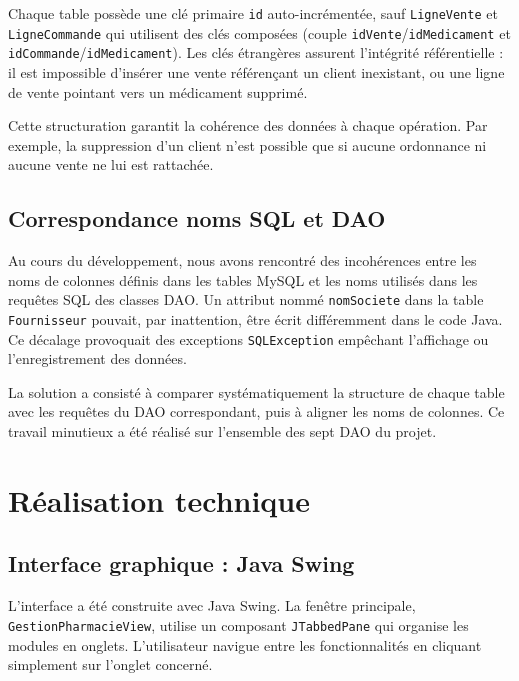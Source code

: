 \documentclass[12pt,a4paper]{report}
\begin{document}
Chaque table possède une clé primaire \texttt{id} auto-incrémentée, sauf \texttt{LigneVente} et \texttt{LigneCommande} qui utilisent des clés composées (couple \texttt{idVente}/\texttt{idMedicament} et \texttt{idCommande}/\texttt{idMedicament}). Les clés étrangères assurent l'intégrité référentielle : il est impossible d'insérer une vente référençant un client inexistant, ou une ligne de vente pointant vers un médicament supprimé.

Cette structuration garantit la cohérence des données à chaque opération. Par exemple, la suppression d'un client n'est possible que si aucune ordonnance ni aucune vente ne lui est rattachée.

\section{Correspondance noms SQL et DAO}

Au cours du développement, nous avons rencontré des incohérences entre les noms de colonnes définis dans les tables MySQL et les noms utilisés dans les requêtes SQL des classes DAO. Un attribut nommé \texttt{nomSociete} dans la table \texttt{Fournisseur} pouvait, par inattention, être écrit différemment dans le code Java. Ce décalage provoquait des exceptions \texttt{SQLException} empêchant l'affichage ou l'enregistrement des données.

La solution a consisté à comparer systématiquement la structure de chaque table avec les requêtes du DAO correspondant, puis à aligner les noms de colonnes. Ce travail minutieux a été réalisé sur l'ensemble des sept DAO du projet.

\chapter{Réalisation technique}

\section{Interface graphique : Java Swing}

L'interface a été construite avec Java Swing. La fenêtre principale, \texttt{GestionPharmacieView}, utilise un composant \texttt{JTabbedPane} qui organise les modules en onglets. L'utilisateur navigue entre les fonctionnalités en cliquant simplement sur l'onglet concerné.
\end{document}
